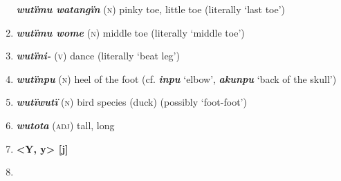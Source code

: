 \begin{enumerate}[noitemsep, label={}, align=left, widest=190, labelsep=1ex,leftmargin=*,itemindent=-10pt]
\textbf{\textit{wutïmu watangïn}} (\textsc{n}) pinky toe, little toe (literally ‘last toe’) \item 
\textbf{\textit{wutïmu wome}} (\textsc{n}) middle toe (literally ‘middle toe’) \item 
\textbf{\textit{wutïni-}} (\textsc{v}) dance (literally ‘beat leg’) \item 
\textbf{\textit{wutïnpu}} (\textsc{n}) heel of the foot (cf. \textbf{\textit{inpu}} ‘elbow’, \textbf{\textit{akunpu}} ‘back of the skull’) \item 
\textbf{\textit{wutïwutï}} (\textsc{n}) bird species (duck) (possibly ‘foot-foot’) \item 
\textbf{\textit{wutota}} (\textsc{adj}) tall, long\\ \item 

\noindent\textbf{<Y, y>        [j]}\\ \item 


\end{enumerate}
